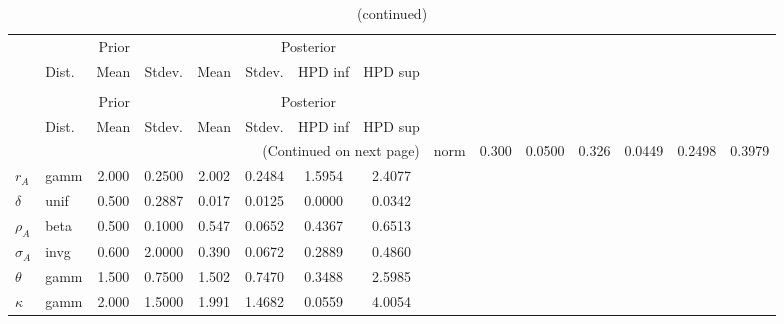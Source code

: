  
\begin{center}
\begin{longtable}{llcccccc} 
\caption{Results from Metropolis-Hastings (parameters)}
 \label{Table:MHPosterior:1}\\
\toprule 
  & \multicolumn{3}{c}{Prior}  &  \multicolumn{4}{c}{Posterior} \\
  \cmidrule(r{.75em}){2-4} \cmidrule(r{.75em}){5-8}
  & Dist. & Mean  & Stdev. & Mean & Stdev. & HPD inf & HPD sup\\
\midrule \endfirsthead 
\caption{(continued)}\\\toprule 
  & \multicolumn{3}{c}{Prior}  &  \multicolumn{4}{c}{Posterior} \\
  \cmidrule(r{.75em}){2-4} \cmidrule(r{.75em}){5-8}
  & Dist. & Mean  & Stdev. & Mean & Stdev. & HPD inf & HPD sup\\
\midrule \endhead 
\bottomrule \multicolumn{8}{r}{(Continued on next page)} \endfoot 
\bottomrule \endlastfoot 
${\alpha}$ & norm &   0.300 & 0.0500 &   0.326& 0.0449 &  0.2498 &  0.3979 \\ 
${r_{A}}$ & gamm &   2.000 & 0.2500 &   2.002& 0.2484 &  1.5954 &  2.4077 \\ 
${\delta}$ & unif &   0.500 & 0.2887 &   0.017& 0.0125 &  0.0000 &  0.0342 \\ 
${\rho_A}$ & beta &   0.500 & 0.1000 &   0.547& 0.0652 &  0.4367 &  0.6513 \\ 
${\sigma_A}$ & invg &   0.600 & 2.0000 &   0.390& 0.0672 &  0.2889 &  0.4860 \\ 
${\theta}$ & gamm &   1.500 & 0.7500 &   1.502& 0.7470 &  0.3488 &  2.5985 \\ 
${\kappa}$ & gamm &   2.000 & 1.5000 &   1.991& 1.4682 &  0.0559 &  4.0054 \\ 
\end{longtable}
 \end{center}
